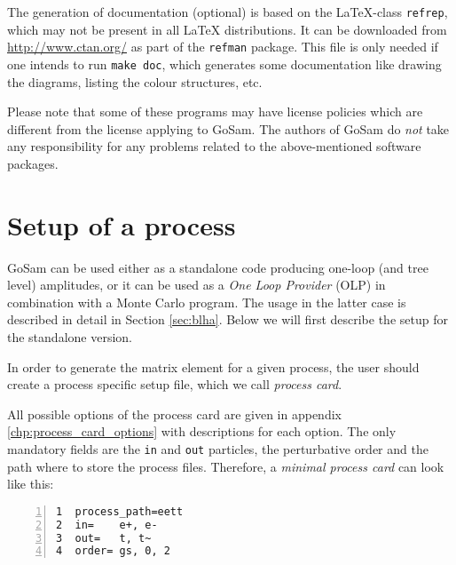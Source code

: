 \documentclass[11pt,a4paper]{refrep}
\newcommand{\gosamversion}{{3{.}0}}
\newcommand{\gosam}{{\sc GoSam}\xspace}
\newcommand{\gosamv}[1][\gosamversion]{{\sc GoSam}\xspace}
\begin{document}
 The generation of documentation (optional)
is based on the \LaTeX-class \texttt{refrep}, which may not be
present in all \LaTeX{}
distributions. It can be downloaded from \url{http://www.ctan.org/}
as part of the \texttt{refman} package.
This file is only needed if one intends to run \texttt{make doc},
which generates some documentation like drawing the diagrams, 
listing the colour structures, etc.

\attention Please note that some of these programs may have
license policies which are different from the license
applying to \gosamv. The authors of \gosamv do \emph{not}
take any responsibility for any problems related to the
above-mentioned software packages.



\chapter{Setup of a process}
\label{chp:setup-of-a-process}


\gosam{} can be used either as a standalone code producing one-loop 
(and tree level) amplitudes, or it can be used as a {\it One Loop Provider} (OLP)
in combination with a Monte Carlo program. 
The usage in the latter case is described in detail in Section \ref{sec:blha}. 
Below we will first describe the setup for the standalone version.


In order to generate the matrix element for a given process, the user should
create a process specific setup file, which we call {\em process card}. 


All possible options of the process card are given in appendix \ref{chp:process_card_options} with descriptions for each option.
The only mandatory fields are the {\tt in} and {\tt out} 
particles, the perturbative order and the path where to store the process files.
Therefore, a {\em minimal process card} can look like this:
\begin{lstlisting}[gobble=3,%
     numbers=left,caption={{\tt eett.in}},%
     basicstyle=\ttfamily]
1  process_path=eett
2  in=    e+, e-
3  out=   t, t~
4  order= gs, 0, 2
\end{lstlisting}
\end{document}
